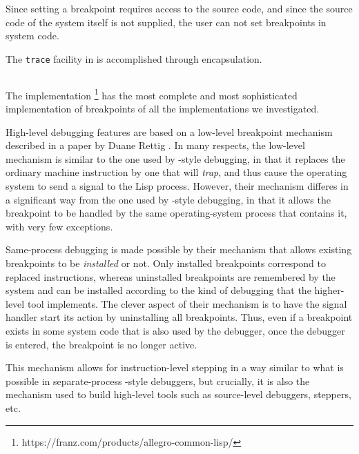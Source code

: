Since setting a breakpoint requires access to the source code, and
since the source code of the system itself is not supplied, the user
can not set breakpoints in system code.

The \texttt{trace} facility in \lispworks{} is accomplished through
encapsulation.

\subsection{\allegro{}}

The \allegro{} \commonlisp{} implementation%
\footnote{https://franz.com/products/allegro-common-lisp/}
has the most complete and most sophisticated implementation of
breakpoints of all the \commonlisp{} implementations we investigated.

High-level debugging features are based on a low-level breakpoint
mechanism described in a paper by Duane Rettig
\cite{Rettig:Instruction-level-breakpoints}.  In many respects, the
low-level mechanism is similar to the one used by \unix{}-style
debugging, in that it replaces the ordinary machine instruction by one
that will \emph{trap}, and thus cause the operating system to send a
signal to the Lisp process.  However, their mechanism differes in a
significant way from the one used by \unix{}-style debugging, in that
it allows the breakpoint to be handled by the same operating-system
process that contains it, with very few exceptions.

Same-process debugging is made possible by their mechanism that allows
existing breakpoints to be \emph{installed} or not.  Only installed
breakpoints correspond to replaced instructions, whereas uninstalled
breakpoints are remembered by the system and can be installed
according to the kind of debugging that the higher-level tool
implements.  The clever aspect of their mechanism is to have the
signal handler start its action by uninstalling all breakpoints.
Thus, even if a breakpoint exists in some system code that is also
used by the debugger, once the debugger is entered, the breakpoint is
no longer active.

This mechanism allows for instruction-level stepping in a way similar
to what is possible in separate-process \unix{}-style debuggers, but
crucially, it is also the mechanism used to build high-level tools
such as source-level debuggers, steppers, etc.
